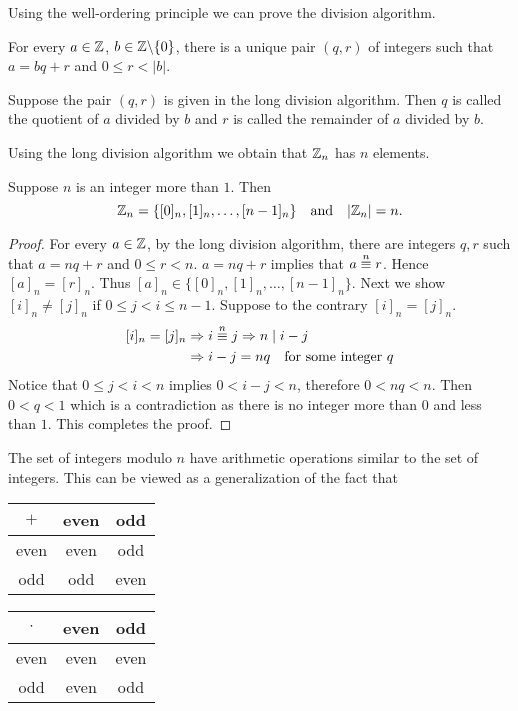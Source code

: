 Using the well-ordering principle we can prove the
division algorithm.

\begin{theorem}
    For every $a\in\mathbb{Z}$, $b\in\mathbb{Z}\backslash\{0\}$,
    there is a unique pair $(q,r)$ of integers
    such that $a=bq+r$ and $0\leq r<|b|$.
\end{theorem}

Suppose the pair $(q,r)$ is given in the long division
algorithm. Then $q$ is called the quotient of $a$ divided by 
$b$ and $r$ is called the remainder of $a$ divided by $b$.

Using the long division algorithm we obtain that $\mathbb{Z}_n$
has $n$ elements.

\begin{proposition}
    Suppose $n$ is an integer more than $1$. Then 
    \[\mathbb{Z}_n=\{[0]_n,[1]_n,\dots,[n-1]_n\}\text{\quad and\quad}|\mathbb{Z}_n|=n.\]
\end{proposition}

\begin{proof}
    For every $a\in\mathbb{Z}$, by the long division algorithm,
    there are integers $q,r$ such that $a=nq+r$ and $0\leq r<n$.
    $a=nq+r$ implies that $a\overset{n}{\equiv} r$. Hence $[a]_n=[r]_n$.
    Thus $[a]_n\in\{[0]_n,[1]_n,\dots,[n-1]_n\}$. Next we show $[i]_n\neq [j]_n$
    if $0\leq j<i\leq n-1$. Suppose to the contrary $[i]_n=[j]_n$.
    \[\begin{split}
        [i]_n=[j]_n&\Rightarrow i\overset{n}{\equiv} j\Rightarrow n\mid i-j \\
                   &\Rightarrow i-j=nq\text{\quad for some integer }q
    \end{split}\]
    Notice that $0\leq j<i<n$ implies $0<i-j<n$, therefore $0<nq<n$.
    Then $0<q<1$ which is a contradiction as there is no integer more than
    $0$ and less than $1$. This completes the proof.
\end{proof}

The set of integers modulo $n$ have arithmetic operations similar to the set
of integers. This can be viewed as a generalization of the fact that
\begin{table}
    \centering
    \begin{tabular}{c|cc}
        $+$ & even & odd \\
        \hline
        even & even & odd \\
        odd & odd & even
    \end{tabular}
    \quad
    \begin{tabular}{c|cc}
        $\cdot$ & even & odd \\
        \hline
        even & even & even \\
        odd & even & odd
    \end{tabular}
\end{table}

